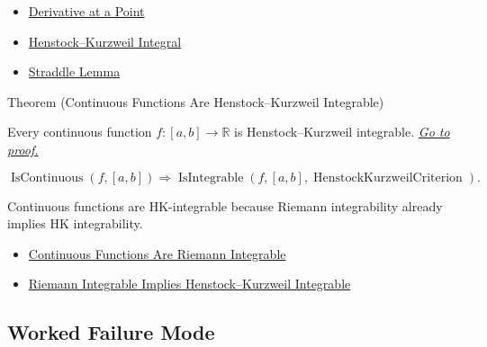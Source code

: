 \begin{dependencies}
\begin{itemize}
  \item \hyperref[def:derivative-at-a-point]{Derivative at a Point}
  \item \hyperref[def:henstock-kurzweil-integral]{Henstock--Kurzweil Integral}
  \item \hyperref[lem:hk-straddle]{Straddle Lemma}
\end{itemize}
\end{dependencies}

\begin{theorembox}{Theorem (Continuous Functions Are Henstock--Kurzweil Integrable)}
\begin{theorem}
\label{thm:continuous-hk-integrable}
Every continuous function \(f:[a,b]\to\mathbb R\) is Henstock--Kurzweil
integrable.
\hyperref[prf:continuous-hk-integrable]{\textit{Go to proof.}}
\end{theorem}
\end{theorembox}

\begin{remark*}
\[
\operatorname{IsContinuous}(f,[a,b])
\Longrightarrow
\operatorname{IsIntegrable}(f,[a,b],\operatorname{HenstockKurzweilCriterion}).
\]
\end{remark*}

\begin{remark*}[Interpretation]
Continuous functions are HK-integrable because Riemann integrability already
implies HK integrability.
\end{remark*}

\begin{dependencies}
\begin{itemize}
  \item \hyperref[thm:continuous-riemann-integrable]{Continuous Functions Are Riemann Integrable}
  \item \hyperref[thm:riemann-integrable-implies-hk-integrable]{Riemann Integrable Implies Henstock--Kurzweil Integrable}
\end{itemize}
\end{dependencies}

\subsection*{Worked Failure Mode}

